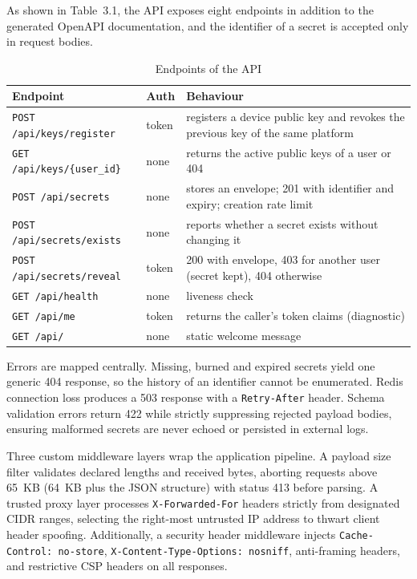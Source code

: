 \documentclass[12pt,a4paper]{article}
\numberwithin{equation}{section}
\numberwithin{figure}{section}
\numberwithin{table}{section}
\newcommand{\tablesetup}{\fontsize{11pt}{13pt}\selectfont\singlespacing\renewcommand{\arraystretch}{1.15}}
\newcommand{\leadin}[1]{%
  {\onehalfspacing\setlength{\parindent}{1.25cm}\indent #1\par}\vspace{8pt}}
\begin{document}
\begin{table}[H]
\leadin{As shown in Table~3.1, the API exposes eight endpoints in addition to the generated OpenAPI documentation, and the identifier of a secret is accepted only in request bodies.}
\tablesetup
\caption{Endpoints of the API}
\label{tab:api}
\begin{tabularx}{\textwidth}{|P{0.38\textwidth}|P{0.11\textwidth}|L|}
\hline
\textbf{Endpoint} & \textbf{Auth} & \textbf{Behaviour} \\ \hline
\texttt{POST /api/keys/register} & token & registers a device public key and revokes the previous key of the same platform \\ \hline
\texttt{GET /api/keys/\{user\_id\}} & none & returns the active public keys of a user or 404 \\ \hline
\texttt{POST /api/secrets} & none & stores an envelope; 201 with identifier and expiry; creation rate limit \\ \hline
\texttt{POST /api/secrets/exists} & none & reports whether a secret exists without changing it \\ \hline
\texttt{POST /api/secrets/reveal} & token & 200 with envelope, 403 for another user (secret kept), 404 otherwise \\ \hline
\texttt{GET /api/health} & none & liveness check \\ \hline
\texttt{GET /api/me} & token & returns the caller's token claims (diagnostic) \\ \hline
\texttt{GET /api/} & none & static welcome message \\ \hline
\end{tabularx}
\end{table}

Errors are mapped centrally. Missing, burned and expired secrets yield one generic 404 response, so the history of an identifier cannot be enumerated. Redis connection loss produces a 503 response with a \texttt{Retry-After} header. Schema validation errors return 422 while strictly suppressing rejected payload bodies, ensuring malformed secrets are never echoed or persisted in external logs.

Three custom middleware layers wrap the application pipeline. A payload size filter validates declared lengths and received bytes, aborting requests above 65~KB (64~KB plus the JSON structure) with status 413 before parsing. A trusted proxy layer processes \texttt{X-Forwarded-For} headers strictly from designated CIDR ranges, selecting the right-most untrusted IP address to thwart client header spoofing. Additionally, a security header middleware injects \texttt{Cache-Control: no-store}, \texttt{X-Content-Type-Options: nosniff}, anti-framing headers, and restrictive CSP headers on all responses.
\end{document}
